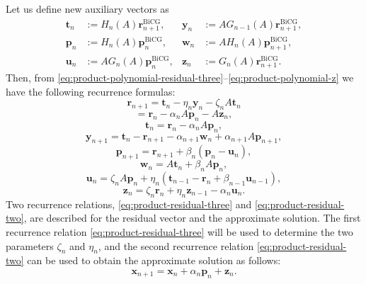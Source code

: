 {Let us define new auxiliary vectors as}
\[\begin{aligned}\bm t_n&:=H_n(A)\bm r_{n+1}^{\mathrm{BiCG}},&\bm y_n&:=AG_{n-1}(A)\bm r_{n+1}^{\mathrm{BiCG}},\\\bm p_n&:=H_n(A)\bm p_n^{\mathrm{BiCG}},&\bm w_n&:=AH_n(A)\bm p_{n+1}^{\mathrm{BiCG}},\\\bm u_n&:=AG_n(A)\bm p_n^{\mathrm{BiCG}},&\bm z_n&:=G_n(A)\bm r_{n+1}^{\mathrm{BiCG}}.\end{aligned}\]
{Then, from \eqref{eq:product-polynomial-residual-three}--\eqref{eq:product-polynomial-z} we have the following recurrence formulas:}
\begin{equation}\label{eq:product-residual-three}\bm r_{n+1}=\bm t_n-\eta_n\bm y_n-\zeta_nA\bm t_n\end{equation}
\begin{equation}\label{eq:product-residual-two}=\bm r_n-\alpha_nA\bm p_n-A\bm z_n,\end{equation}
\begin{equation}\label{eq:product-t}\bm t_n=\bm r_n-\alpha_nA\bm p_n,\end{equation}
\begin{equation}\label{eq:product-y}\bm y_{n+1}=\bm t_n-\bm r_{n+1}-\alpha_{n+1}\bm w_n+\alpha_{n+1}A\bm p_{n+1},\end{equation}
\begin{equation}\label{eq:product-p}\bm p_{n+1}=\bm r_{n+1}+\beta_n(\bm p_n-\bm u_n),\end{equation}
\begin{equation}\label{eq:product-w}\bm w_n=A\bm t_n+\beta_nA\bm p_n,\end{equation}
\begin{equation}\label{eq:product-u}\bm u_n=\zeta_nA\bm p_n+\eta_n(\bm t_{n-1}-\bm r_n+\beta_{n-1}\bm u_{n-1}),\end{equation}
\begin{equation}\label{eq:product-z}\bm z_n=\zeta_n\bm r_n+\eta_n\bm z_{n-1}-\alpha_n\bm u_n.\end{equation}
{Two recurrence relations, \eqref{eq:product-residual-three} and \eqref{eq:product-residual-two}, are described for the residual vector and the approximate solution. The first recurrence relation \eqref{eq:product-residual-three} will be used to determine the two parameters $\zeta_n$ and $\eta_n$, and the second recurrence relation \eqref{eq:product-residual-two} can be used to obtain the approximate solution as follows:}
\[\bm x_{n+1}=\bm x_n+\alpha_n\bm p_n+\bm z_n.\]
